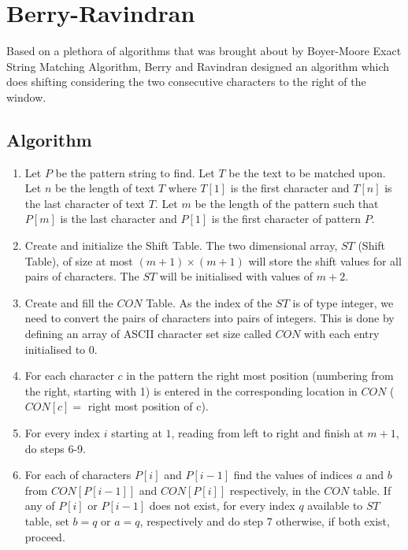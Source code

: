 \section{Berry-Ravindran}
Based on a plethora of algorithms that was brought about by Boyer-Moore Exact String Matching Algorithm, Berry and Ravindran designed an algorithm which does shifting considering the two consecutive characters to the right of the window.
\subsection{Algorithm}
\begin{enumerate}
\item Let $P$ be the pattern string to find. Let $T$ be the text to be matched upon. Let $n$ be the length of text $T$ where $T[1]$ is the first character and $T[n]$ is the last character of text $T$. Let $m$ be the length of the pattern such that $P[m]$ is the last character and $P[1]$ is the first character of pattern $P$.

\item Create and initialize the Shift Table. The two dimensional array, $ST$ (Shift Table), of size at most $(m+1)\times(m+1)$ will store the shift values for all pairs of characters. The $ST$ will be initialised with values of $m+2$.

\item Create and fill the $CON$ Table. As the index of the $ST$ is of type integer, we need to convert the pairs of characters into pairs of integers. This is done by defining an array of ASCII character set size called $CON$ with each entry initialised to $0$.

\item For each character $c$ in the pattern the right most position (numbering from the right, starting with 1) is entered in the corresponding location in $CON$ ($CON[c]=$ right most position of c).

\item For every index $i$ starting at $1$, reading from left to right and finish at $m+1$, do steps 6-9.

	\item For each of characters $P[i]$ and $P[i-1]$ find the values of indices $a$ and $b$ from $CON[P[i-1]]$ and $CON[P[i]]$ respectively, in the $CON$ table. If any of $P[i]$ or $P[i-1]$ does not exist, for every index $q$ available to $ST$ table, set $b=q$ or $a=q$, respectively and do step 7 otherwise, if both exist, proceed.


\end{enumerate}
